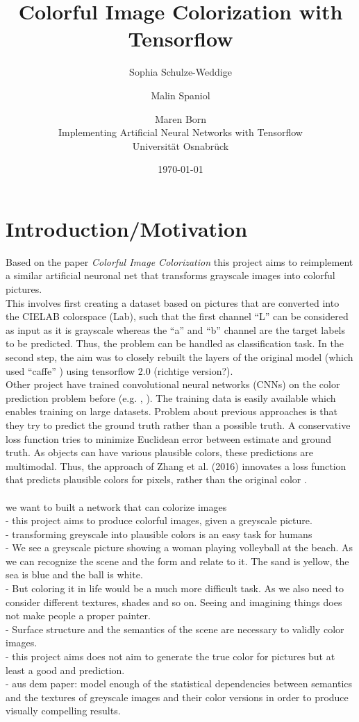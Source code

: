 \documentclass[12pt,letterpaper]{article}
\title{Colorful Image Colorization with Tensorflow}
\date{\today}
\author{Sophia Schulze-Weddige \and Malin Spaniol \and Maren Born \\Implementing Artificial Neural Networks with Tensorflow \\Universität Osnabrück}
\begin{document}
\maketitle
\thispagestyle{empty}

\section{Introduction/Motivation}
Based on the paper \emph{Colorful Image Colorization} \citep{Zhang.2016} this project aims to reimplement a similar artificial neuronal net that transforms grayscale images into colorful pictures.\\
This involves first creating a dataset based on pictures that are converted into the CIELAB colorspace (Lab), such that the first channel \enquote{L} can be considered as input as it is grayscale whereas the \enquote{a} and \enquote{b} channel are the target labels to be predicted. Thus, the problem can be handled as classification task. In the second step, the aim was to closely rebuilt the layers of the original model (which used \enquote{caffe} \citep{jia2014caffe}) using tensorflow 2.0 (richtige version?).\\
Other project have trained convolutional neural networks (CNNs) on the color prediction problem before (e.g. \cite{Cheng_2015}, \cite{Dahl.2016}). The training data is easily available which enables training on large datasets. Problem about previous approaches is that they try to predict the ground truth rather than a possible truth. A conservative loss function tries to minimize Euclidean error between estimate and ground truth. As objects can have various plausible colors, these predictions are multimodal. Thus, the approach of Zhang et al. (2016) innovates a loss function that predicts plausible colors for pixels, rather than the original color \citep{Zhang.2016}.\\
\\

we want to built a network that can colorize images\\
- this project aims to produce colorful images, given a greyscale picture.\\
- transforming greyscale into plausible colors is an easy task for humans\\
- We see a greyscale picture showing a woman playing volleyball at the beach. As we can recognize the scene and the form and relate to it. The sand is yellow, the sea is blue and the ball is white.\\
- But coloring it in life would be a much more difficult task. As we also need to consider different textures, shades and so on. Seeing and imagining things does not make people a proper painter.\\
- Surface structure and the semantics of the scene are necessary to validly color images.\\
- this project aims does not aim to generate the true color for pictures but at least a good and prediction.\\
- aus dem paper: model enough of the statistical dependencies between semantics and the textures of greyscale images and their color versions in order to produce visually compelling results.\\
\end{document}
